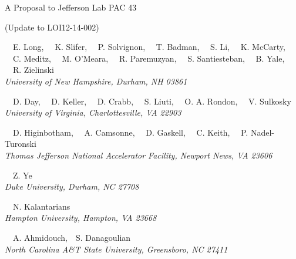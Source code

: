 \begin{center}
A Proposal to Jefferson Lab PAC 43

(Update to LOI12-14-002)

\vspace{15px}

\setcounter{footnote}{\SPOKES}
%
{~~E. Long,\setcounter{footnote}{\SPOKES}
\setcounter{footnote}{\SPOKES}\footnotemark {}
\setcounter{footnote}{\CONTACT}\footnotemark{}
~~K. Slifer,\setcounter{footnote}{\SPOKES}\footnotemark
~~P. Solvignon,\setcounter{footnote}{\SPOKES}\footnotemark
~~T. Badman,
~~S. Li,
~~K. McCarty,
~~C. Meditz,
~~M. O'Meara,
~~R. Paremuzyan,
~~S. Santiesteban,
~~B. Yale,
~~R. Zielinski
}\\
\ls
{\normalsize\it{University of New Hampshire, Durham, NH 03861}}

\vspace{10px}

{~~D. Day,\setcounter{footnote}{\SPOKES}\footnotemark
~~D. Keller,\setcounter{footnote}{\SPOKES}\footnotemark
~~D. Crabb,
~~S. Liuti,
~~O. A. Rondon,
~~V. Sulkosky}\\
\ls
{\normalsize\it{University of Virginia, Charlottesville, VA 22903}}

\vspace{10px}

{~~D. Higinbotham\setcounter{footnote}{\SPOKES}\footnotemark,
~~A. Camsonne,
~~D. Gaskell,
~~C. Keith,
~~P. Nadel-Turonski}\\
\ls
{\normalsize\it{Thomas Jefferson National Accelerator Facility, Newport News, VA 23606}}

\vspace{10px}

{~~Z. Ye}\\
\ls
{\normalsize\it{Duke University, Durham, NC 27708}}

\vspace{10px}

{~~N. Kalantarians}\\
\ls
{\normalsize\it{Hampton University, Hampton, VA 23668}}

\vspace{10px}

{~~A. Ahmidouch,~~S. Danagoulian}\\
\ls
{\normalsize\it{North Carolina A\&T State University, Greensboro, NC 27411}}


\end{center}
